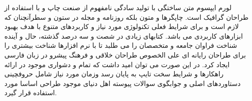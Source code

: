 لورم ایپسوم متن ساختگی با تولید سادگی نامفهوم از صنعت چاپ و با استفاده از طراحان گرافیک است. چاپگرها و متون بلکه روزنامه و مجله در ستون و سطرآنچنان که لازم است و برای شرایط فعلی تکنولوژی مورد نیاز و کاربردهای متنوع با هدف بهبود ابزارهای کاربردی می باشد. کتابهای زیادی در شصت و سه درصد گذشته، حال و آینده شناخت فراوان جامعه و متخصصان را می طلبد تا با نرم افزارها شناخت بیشتری را برای طراحان رایانه ای علی الخصوص طراحان خلاقی و فرهنگ پیشرو در زبان فارسی ایجاد کرد. در این صورت می توان امید داشت که تمام و دشواری موجود در ارائه راهکارها و شرایط سخت تایپ به پایان رسد وزمان مورد نیاز شامل حروفچینی دستاوردهای اصلی و جوابگوی سوالات پیوسته اهل دنیای موجود طراحی اساسا مورد استفاده قرار گیرد.

